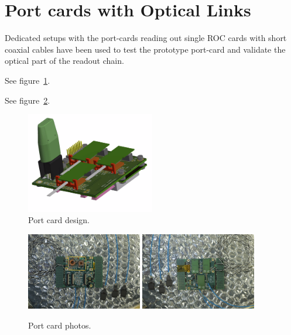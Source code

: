 \documentclass[a4paper,11pt]{article}
\begin{document}
\section{Port cards with Optical Links}
\label{sec:optical}

Dedicated setups with the port-cards reading out single ROC cards with short coaxial cables have been used to test the prototype port-card and validate the optical part of the readout chain.

See figure~\ref{fig:port_card_design}.

See figure~\ref{fig:port_card_pics}.

\begin{figure}[htbp]
\centering
\includegraphics[width=0.5\textwidth,origin=c]{../figures/port_card_design.png}
\caption{
\label{fig:port_card_design}
Port card design.
}
\end{figure}

\begin{figure}[htbp]
\centering
\includegraphics[width=0.45\textwidth,origin=c]{../figures/port_card_front.jpeg}
\qquad
\includegraphics[width=0.45\textwidth,origin=c]{../figures/port_card_back.jpeg}
\caption{
\label{fig:port_card_pics}
Port card photos.
}
\end{figure}
\end{document}
